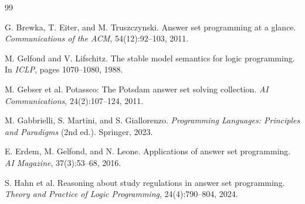 ﻿\documentclass[11pt,a4paper]{article}
\begin{document}
\begin{thebibliography}{99}

G. Brewka, T. Eiter, and M. Truszczynski.
\newblock Answer set programming at a glance.
\newblock \emph{Communications of the ACM}, 54(12):92--103, 2011.

M. Gelfond and V. Lifschitz.
\newblock The stable model semantics for logic programming.
\newblock In \emph{ICLP}, pages 1070--1080, 1988.

M. Gebser et al.
\newblock Potassco: The Potsdam answer set solving collection.
\newblock \emph{AI Communications}, 24(2):107--124, 2011.

M. Gabbrielli, S. Martini, and S. Giallorenzo.
\newblock \emph{Programming Languages: Principles and Paradigms} (2nd ed.).
\newblock Springer, 2023.

E. Erdem, M. Gelfond, and N. Leone.
\newblock Applications of answer set programming.
\newblock \emph{AI Magazine}, 37(3):53--68, 2016.

S. Hahn et al.
\newblock Reasoning about study regulations in answer set programming.
\newblock \emph{Theory and Practice of Logic Programming}, 24(4):790--804, 2024.

\end{thebibliography}
\end{document}
